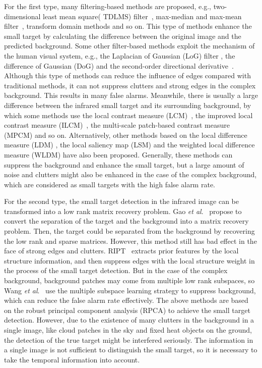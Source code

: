 \documentclass[journal]{IEEEtran}
\begin{document}
For the first type, many filtering-based methods are proposed, e.g., two-dimensional least mean square( TDLMS) filter~\cite{hadhoud1988two}, max-median and max-mean filter~\cite{deshpande1999max}, transform domain methods \cite{davidson2002wavelet,peng2004dim} and so on. This type of methods enhance the small target by calculating the difference between the original image and the predicted background. Some other filter-based methods exploit the mechanism of the human visual system, e.g., the Laplacian of Gaussian (LoG) filter \cite{kim2009small}, the difference of Gaussian (DoG) \cite{wang2012infrared} and the second-order directional derivative~\cite{qi2013robust}. Although this type of methods can reduce the influence of edges compared with traditional methods, it can not suppress clutters and strong edges in the complex background. This results in many false alarms. Meanwhile, there is usually a large difference between the infrared small target and its surrounding background, by which some methods use the local contrast measure (LCM)~\cite{chen2014local}, the improved local contrast measure (ILCM)~\cite{han2014robust}, the multi-scale patch-based contrast measure (MPCM) \cite{wei2016multiscale} and so on. Alternatively, other methods based on the local difference measure (LDM) \cite{deng2017entropy}, the local saliency map (LSM) \cite{chen2016efficient} and the weighted local difference measure (WLDM) \cite{deng2016small} have also been proposed. Generally, these methods can suppress the background and enhance the small target, but a large amount of noise and clutters might also be enhanced in the case of the complex background, which are considered as small targets with the high false alarm rate.

For the second type, the small target detection in the infrared image can be transformed into a low rank matrix recovery problem. Gao \emph{et al}.~\cite{gao2013infrared} propose to convert the separation of the target and the background into a matrix recovery problem. Then, the target could be separated from the background by recovering the low rank and sparse matrices. However, this method still has bad effect in the face of strong edges and clutters. RIPT~\cite{dai2017reweighted} extracts prior features by the local structure information, and then suppress edges with the local structure weight in the process of the small target detection. But in the case of the complex background, background patches may come from multiple low rank subspaces, so Wang \emph{et al}.~\cite{wang2017infrared} use the multiple subspace learning strategy to suppress background, which can reduce the false alarm rate effectively. The above methods are based on the robust principal component analysis (RPCA) to achieve the small target detection. However, due to the existence of many clutters in the background in a single image, like cloud patches in the sky and fixed heat objects on the ground, the detection of the true target might be interfered seriously. The information in a single image is not sufficient to distinguish the small target, so it is necessary to take the temporal information into account.
\end{document}

